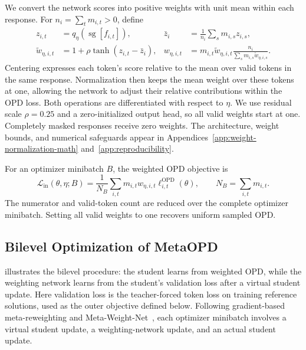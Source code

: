 \documentclass{article}
\theoremstyle{plain}
\theoremstyle{definition}
\theoremstyle{remark}
\begin{document}
We convert the network scores into positive weights with unit mean within each response. For \(n_i=\sum_t m_{i,t}>0\), define
\begin{equation}
\begin{aligned}
    z_{i,t}&=q_\eta(\operatorname{sg}[f_{i,t}]),
    &\bar z_i&=\frac{1}{n_i}\sum_s m_{i,s}z_{i,s},\\
    \widetilde w_{\eta,i,t}&=1+\rho\tanh(z_{i,t}-\bar z_i),
    &w_{\eta,i,t}&=m_{i,t}\widetilde w_{\eta,i,t}
       \frac{n_i}{\sum_s m_{i,s}\widetilde w_{\eta,i,s}}.
\end{aligned}
\label{eq:weight-normalization}
\end{equation}
Centering expresses each token's score relative to the mean over valid tokens in the same response. Normalization then keeps the mean weight over these tokens at one, allowing the network to adjust their relative contributions within the OPD loss. Both operations are differentiated with respect to \(\eta\). We use residual scale \(\rho=0.25\) and a zero-initialized output head, so all valid weights start at one. Completely masked responses receive zero weights. The architecture, weight bounds, and numerical safeguards appear in Appendices~\ref{app:weight-normalization-math} and~\ref{app:reproducibility}.

For an optimizer minibatch \(B\), the weighted OPD objective is
\begin{equation}
    \mathcal L_{\mathrm{in}}(\theta,\eta;B)
    =\frac{1}{N_B}\sum_{i,t}
      m_{i,t}w_{\eta,i,t}\ell^{\mathrm{OPD}}_{i,t}(\theta),
    \qquad N_B=\sum_{i,t}m_{i,t}.
    \label{eq:inner-loss}
\end{equation}
The numerator and valid-token count are reduced over the complete optimizer minibatch. Setting all valid weights to one recovers uniform sampled OPD.

\subsection{Bilevel Optimization of MetaOPD}
\label{sec:bilevel-reweighting}


 illustrates the bilevel procedure: the student learns from weighted OPD, while the weighting network learns from the student's validation loss after a virtual student update. Here validation loss is the teacher-forced token loss on training reference solutions, used as the outer objective defined below. Following gradient-based meta-reweighting and Meta-Weight-Net~\citep{ren2018learning,shu2019meta}, each optimizer minibatch involves a virtual student update, a weighting-network update, and an actual student update.
\end{document}
